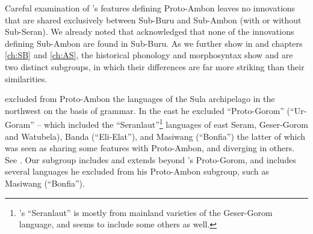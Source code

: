 Careful examination of \citeauthor{Stresemann1927}’s features defining Proto-Ambon
leaves no innovations that are shared exclusively between
Sub-Buru and Sub-Ambon (with or without Sub-Seran).
We already noted that \citet[7]{Stresemann1927} acknowledged
that none of the innovations defining Sub-Ambon are found in Sub-Buru.
As we further show in 
and chapters \ref{ch:SB} and \ref{ch:AS}, the historical phonology
and morphosyntax show 
and  are two distinct subgroups,
in which their differences are far more striking than their similarities.

\citeauthor{Stresemann1927} excluded from Proto-Ambon the languages of the Sula
archipelago in the northwest on the basis of grammar.
In the east he excluded “Proto-Gorom” (“Ur-Goram” -- which included
the “Seranlaut”\footnote{
		\citeauthor{Stresemann1927}’s “Seranlaut” is mostly from
		mainland varieties of the Geser-Gorom language,
		and seems to include some others as well.}
languages of east
Seram, Geser-Gorom and Watubela), Banda (“Eli-Elat”),
and Masiwang (“Bonfia”) the latter of which was seen as sharing
some features with Proto-Ambon,
and diverging in others. See .
Our  subgroup includes
and extends beyond \citeauthor{Stresemann1927}’s Proto-Gorom,
and includes several languages he excluded from his Proto-Ambon
subgroup, such as Masiwang (“Bonfia”).
